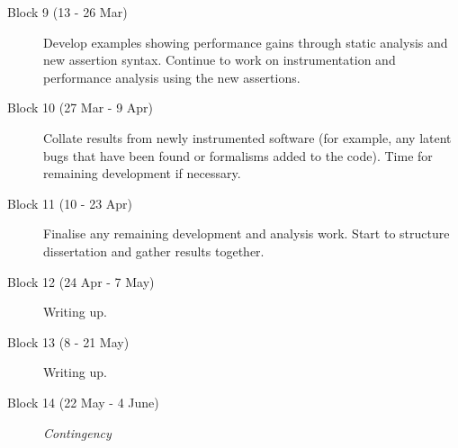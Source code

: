 \documentclass[11pt]{article}
\begin{document}
\begin{description}
  \item[Block 9 (13 - 26 Mar)] Develop examples showing performance gains through static
    analysis and new assertion syntax. Continue to work on instrumentation and performance
    analysis using the new assertions.

  \item[Block 10 (27 Mar - 9 Apr)] Collate results from newly instrumented software (for
    example, any latent bugs that have been found or formalisms added to the code). Time
    for remaining development if necessary.

  \item[Block 11 (10 - 23 Apr)] Finalise any remaining development and analysis work.
    Start to structure dissertation and gather results together.
  \item[Block 12 (24 Apr - 7 May)] Writing up.
  \item[Block 13 (8 - 21 May)] Writing up.
  \item[Block 14 (22 May - 4 June)] \textit{Contingency}
\end{description}

\newpage
\appendix

\printbibliography
\end{document}
